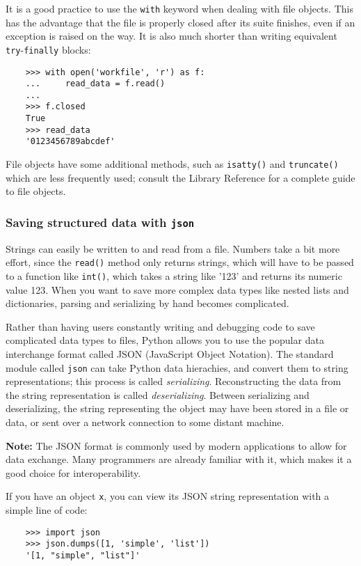 \documentclass[UTF8]{article}
\begin{document}
It is a good practice to use the \texttt{with} keyword when dealing with file objects.
This has the advantage that the file is properly closed after its suite finishes, even if an
exception is raised on the way. It is also much shorter than writing equivalent
\texttt{try}-\texttt{finally} blocks:
\begin{verbatim}
    >>> with open('workfile', 'r') as f:
    ...     read_data = f.read()
    ...
    >>> f.closed
    True
    >>> read_data
    '0123456789abcdef'
\end{verbatim}

File objects have some additional methods, such as \texttt{isatty()} and \texttt{truncate()} which
are less frequently used; consult the Library Reference for a complete guide to file objects.

\subsubsection{Saving structured data with \texttt{json}}
Strings can easily be written to and read from a file. Numbers take a bit more effort, since the
\texttt{read()} method only returns strings, which will have to be passed to a function like
\texttt{int()}, which takes a string like '123' and returns its numeric value 123. When you want to
save more complex data types like nested lists and dictionaries, parsing and serializing by hand
becomes complicated.

Rather than having users constantly writing and debugging code to save complicated data types to
files, Python allows you to use the popular data interchange format called JSON (JavaScript Object
Notation). The standard module called \texttt{json} can take Python data hierachies, and convert
them to string representations; this process is called \emph{serializing}. Reconstructing the data
from the string representation is called \emph{deserializing}. Between serializing and
deserializing, the string representing the object may have been stored in a file or data, or sent
over a network connection to some distant machine.

\textbf{Note:} The JSON format is commonly used by modern applications to allow for data exchange.
Many programmers are already familiar with it, which makes it a good choice for interoperability.

If you have an object \texttt{x}, you can view its JSON string representation with a simple line of
code:
\begin{verbatim}
    >>> import json
    >>> json.dumps([1, 'simple', 'list'])
    '[1, "simple", "list"]'
\end{verbatim}
\end{document}
